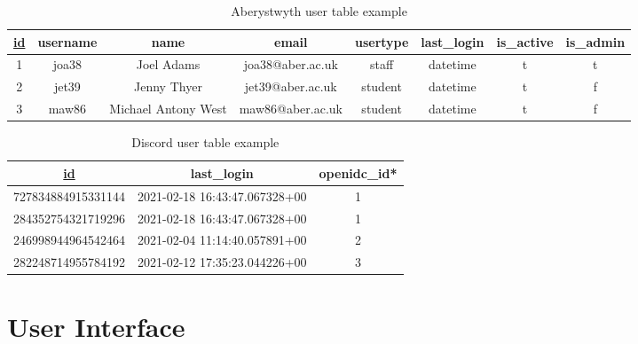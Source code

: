 \begin{table}[H]
	\centering
	\small
	\setlength\tabcolsep{2pt}
	\begin{tabular}{|c|c|c|c|c|c|c|c|}
		\hline
		\underline{id} & username & name & email & usertype & last\_login & is\_active & is\_admin \\
		\hline
		1 & joa38 & Joel Adams & joa38@aber.ac.uk & staff & datetime & t & t \\
		2 & jet39 & Jenny Thyer & jet39@aber.ac.uk & student & datetime & t & f \\
		3 & maw86 & Michael Antony West & maw86@aber.ac.uk & student & datetime & t & f \\
		\hline 
	\end{tabular}
	\caption{Aberystwyth user table example}
	\label{tab:aber-table}
\end{table}

\begin{table}[H]
	\centering
	\small
	\setlength\tabcolsep{2pt}
	\begin{tabular}{|c|c|c|}
		\hline
		\underline{id}                 & last\_login                   & openidc\_id* \\
		\hline
		727834884915331144 & 2021-02-18 16:43:47.067328+00 & 1           \\
		284352754321719296 & 2021-02-18 16:43:47.067328+00 & 1           \\
		246998944964542464 & 2021-02-04 11:14:40.057891+00 & 2           \\
		282248714955784192 & 2021-02-12 17:35:23.044226+00 & 3           \\
		\hline
	\end{tabular}
	\caption{Discord user table example}
	\label{tab:dis-table}
\end{table}

\section{User Interface}

